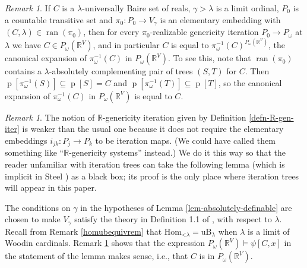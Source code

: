 \documentclass[fleqn, 11pt]{amsart}
\theoremstyle{plain}
\theoremstyle{definition}
\theoremstyle{remark}
\newtheorem{rem}[thm]{Remark} \newtheorem*{rem*}{Remark}
\newcommand{\Hom}{\mathrm{Hom}}
\newcommand{\uB}{\mathrm{uB}}
\newcommand{\Col}{\mathrm{Col}}
\newcommand{\less}{\mathord{<}}
\DeclareMathOperator{\ran}{ran}
\DeclareMathOperator{\p}{p}
\begin{document}
\begin{rem}\label{treemovecorrem}
If $C$ is a $\lambda$-universally Baire set of reals, $\gamma > \lambda$ is a limit ordinal, $P_{0}$ is a countable transitive set and $\pi_0 \colon P_0 \to V_{\gamma}$ is an elementary embedding with $(C,\lambda) \in \ran(\pi_0)$, then for every $\pi_0$-realizable genericity iteration $P_0 \to P_\omega$ at $\lambda$ we have $C \in P_\omega(\mathbb{R}^V)$, and in particular $C$ is equal to $\pi_\omega^{-1}(C)^{P_\omega(\mathbb{R}^V)}$, the canonical expansion of $\pi_\omega^{-1}(C)$ in $P_\omega(\mathbb{R}^V)$. 
To see this, note that $\ran(\pi_0)$ contains a $\lambda$-absolutely complementing pair of trees $(S,T)$ for $C$. Then  $\p[\pi_\omega^{-1}(S)] \subseteq \p[S] = C$ and $\p[\pi_\omega^{-1}(T)] \subseteq \p[T]$, so the canonical expansion of $\pi_\omega^{-1}(C)$ in $P_\omega(\mathbb{R}^V)$ is equal to $C$.
\end{rem} 







\begin{rem}
 The notion of $\mathbb{R}$-genericity iteration given by 
 Definition \ref{defn-R-gen-iter}  is weaker than the usual one because it does not require the elementary embeddings $i_{jk} \colon P_j \to P_k$ to be iteration maps.
 (We could have called them something like ``$\mathbb{R}$-genericity systems'' instead.)
 We do it this way so that the reader unfamiliar with iteration trees can take the following lemma (which is implicit in Steel \cite{SteSTFree}) as a black box; its proof is the only place where iteration trees will appear in this paper. 
\end{rem}
 
The conditions on $\gamma$ in the hypotheses of Lemma \ref{lem-absolutely-definable} are chosen to make $V_{\gamma}$ satisfy the theory in Definition 1.1 of \cite{MarSteIterationTrees}, with respect to $\lambda$. Recall from Remark \ref{homubequivrem} that $\Hom_{\less\lambda} = \uB_{\lambda}$ when $\lambda$ is a limit of Woodin cardinals. Remark \ref{treemovecorrem} shows that the expression $P_\omega(\mathbb{R}^V) \models \psi[C,x]$ in the statement of the lemma makes sense, i.e., that $C$ is in $P_{\omega}(\mathbb{R}^{V})$. 
 
\end{document}
